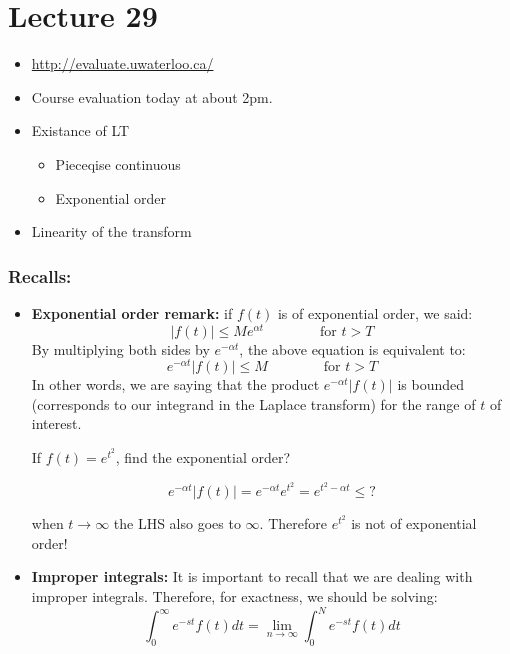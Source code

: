 
\chapter*{Lecture 29}

\begin{recall}{}{}
\begin{itemize}
\item \url{http://evaluate.uwaterloo.ca/}
\item Course evaluation today at about 2pm.
\item Existance of LT
\begin{itemize}
\item Pieceqise continuous
\item Exponential order
\end{itemize}
\item Linearity of the transform
\end{itemize}
\end{recall}

\subsection*{Recalls:}
\begin{itemize}
\item \textbf{Exponential order remark:} if $f(t)$ is of exponential order, we said:
\begin{equation*}
\left|f(t)\right|\leq M e^{\alpha t} \qquad \qquad \text{for } t>T
\end{equation*}
By multiplying both sides by  $e^{-\alpha t}$, the above equation is equivalent to:
\begin{equation*}
e^{-\alpha t}\left|f(t)\right|\leq M \qquad \qquad \text{for } t>T
\end{equation*}
In other words, we are saying that the product $e^{-\alpha t} \left|f(t)\right|$ is bounded (corresponds to our integrand in the Laplace transform) for the range of $t$ of interest.

If $f(t)=e^{t^2}$, find the exponential order?

\begin{equation*}
e^{-\alpha t}\left|f(t) \right|=e^{-\alpha t}e^{t^2}=e^{t^2-\alpha t} \leq ?  \end{equation*}

when $t\rightarrow \infty$ the LHS also goes to $\infty$. Therefore $e^{t^2}$ is not of exponential order!

\item \textbf{Improper integrals:} It is important to recall that we are dealing with {improper integrals}. Therefore, for exactness, we should be solving:
\begin{equation}
\int^\infty_0 e^{-st} f(t) dt=\lim_{n \rightarrow \infty} \int^N_0 e^{-st} f(t) dt
\end{equation}
\end{itemize}


